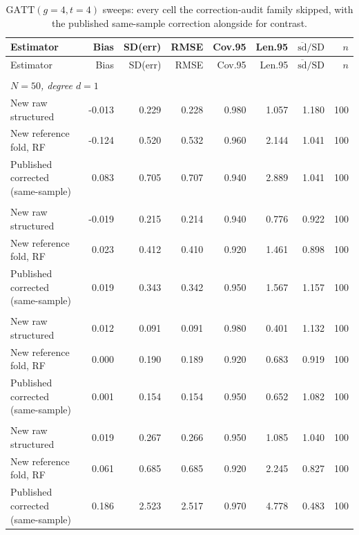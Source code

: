{\footnotesize
\begin{longtable}{lrrrrrrr}
\caption{$\mathrm{GATT}(g{=}4,t{=}4)$ sweeps: every cell the correction-audit family skipped, with the published same-sample correction alongside for contrast.}\label{tab:completion_sweep}\\
\toprule
Estimator & Bias & SD(err) & RMSE & Cov.95 & Len.95 & $\overline{\mathrm{sd}}/\mathrm{SD}$ & $n$ \\
\midrule
\endfirsthead
Estimator & Bias & SD(err) & RMSE & Cov.95 & Len.95 & $\overline{\mathrm{sd}}/\mathrm{SD}$ & $n$ \\
\midrule
\endhead
\bottomrule
\endlastfoot
\multicolumn{8}{l}{\textit{baseline\_sweep}} \\
\multicolumn{8}{l}{\textit{$N=50$, degree $d=1$}} \\
\quad New raw structured & -0.013 & 0.229 & 0.228 & 0.980 & 1.057 & 1.180 & 100 \\
\quad New reference fold, RF & -0.124 & 0.520 & 0.532 & 0.960 & 2.144 & 1.041 & 100 \\
\quad Published corrected (same-sample) & 0.083 & 0.705 & 0.707 & 0.940 & 2.889 & 1.041 & 100 \\
\addlinespace
\multicolumn{8}{l}{\textit{$N=100$, degree $d=1$}} \\
\quad New raw structured & -0.019 & 0.215 & 0.214 & 0.940 & 0.776 & 0.922 & 100 \\
\quad New reference fold, RF & 0.023 & 0.412 & 0.410 & 0.920 & 1.461 & 0.898 & 100 \\
\quad Published corrected (same-sample) & 0.019 & 0.343 & 0.342 & 0.950 & 1.567 & 1.157 & 100 \\
\addlinespace
\multicolumn{8}{l}{\textit{$N=400$, degree $d=1$}} \\
\quad New raw structured & 0.012 & 0.091 & 0.091 & 0.980 & 0.401 & 1.132 & 100 \\
\quad New reference fold, RF & 0.000 & 0.190 & 0.189 & 0.920 & 0.683 & 0.919 & 100 \\
\quad Published corrected (same-sample) & 0.001 & 0.154 & 0.154 & 0.950 & 0.652 & 1.082 & 100 \\
\addlinespace
\multicolumn{8}{l}{\textit{$N=50$, degree $d=2$}} \\
\quad New raw structured & 0.019 & 0.267 & 0.266 & 0.950 & 1.085 & 1.040 & 100 \\
\quad New reference fold, RF & 0.061 & 0.685 & 0.685 & 0.920 & 2.245 & 0.827 & 100 \\
\quad Published corrected (same-sample) & 0.186 & 2.523 & 2.517 & 0.970 & 4.778 & 0.483 & 100 \\

\end{longtable}}
